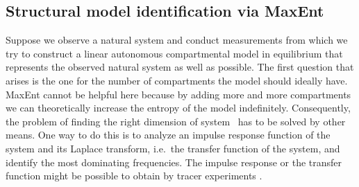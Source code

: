 \documentclass[smallextended]{svjour3}
\makeatletter
\renewcommand*{\eqref}[1]{%
  \hyperref[{#1}]{\textup{\tagform@{\ref*{#1}}}}%
}
\newcommand{\ie}{i.e.}
\makeatother
\begin{document}
\subsection{Structural model identification via MaxEnt}
Suppose we observe a natural system and conduct measurements from which we try to construct a linear autonomous compartmental model in equilibrium that represents the observed natural system as well as possible.
The first question that arises is the one for the number of compartments the model should ideally have.
MaxEnt cannot be helpful here because by adding more and more compartments we can theoretically increase the entropy of the model indefinitely.
Consequently, the problem of finding the right dimension of system~\eqref{eqn:lin_CS_sys} has to be solved by other means.
One way to do this is to analyze an impulse response function of the system and its Laplace transform, \ie\ the transfer function of the system, and identify the most dominating frequencies.
The impulse response or the transfer function might be possible to obtain by tracer experiments \citep{Anderson1983, Walter1986MBS}.
\end{document}
